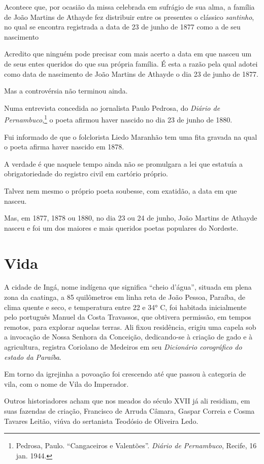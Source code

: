 Acontece que, por ocasião da missa celebrada em
sufrágio de sua alma, a família de João Martins de Athayde
fez distribuir entre os presentes o clássico \textit{santinho}, no qual
se encontra registrada a data de 23 de junho de 1877 como
a de seu nascimento

Acredito que ninguém pode precisar com mais acerto a
data em que nasceu um de seus entes queridos do que sua
própria família. É esta a razão pela qual adotei como data
de nascimento de João Martins de Athayde o dia 23 de
junho de 1877.

Mas a controvérsia não terminou ainda.

Numa entrevista concedida ao jornalista Paulo Pedrosa,
do \textit{Diário de Pernambuco},\footnote{ Pedrosa, Paulo.
``Cangaceiros e Valentões''. \textit{Diário de
Pernambuco}, Recife, 16 jan. 1944.} o poeta afirmou haver nascido
no dia 23 de junho de 1880.

Fui informado de que o folclorista Liedo Maranhão tem
uma fita gravada na qual o poeta afirma haver nascido em
1878.

A verdade é que naquele tempo ainda não se promulgara
a lei que estatuía a obrigatoriedade do registro civil em
cartório próprio.

Talvez nem mesmo o próprio poeta soubesse, com
exatidão, a data em que nasceu.

Mas, em 1877, 1878 ou 1880, no dia 23 ou 24 de junho,
João Martins de Athayde nasceu e foi um dos maiores e
mais queridos poetas populares do Nordeste.

\section{Vida}

A cidade de Ingá, nome indígena que significa ``cheio
d'água'', situada em plena zona da
caatinga, a 85
quilômetros em linha reta de João Pessoa, Paraíba, de clima
quente e seco, e temperatura entre 22 e 34° C, foi habitada
inicialmente pelo português Manuel da Costa Travassos, que
obtivera permissão, em tempos remotos, para explorar
aquelas terras. Ali fixou residência, erigiu uma capela sob a
invocação de Nossa Senhora da Conceição, dedicando-se à
criação de gado e à agricultura, registra Coriolano de
Medeiros em seu \textit{Dicionário corográfico do estado da Paraíba}.

Em torno da igrejinha a povoação foi crescendo até que
passou à categoria de vila, com o nome de Vila do Imperador.

Outros historiadores acham que nos meados do século
XVII já ali residiam, em suas fazendas de criação, Francisco
de Arruda Câmara, Gaspar Correia e Cosma Tavares
Leitão, viúva do sertanista Teodósio de Oliveira Ledo.

